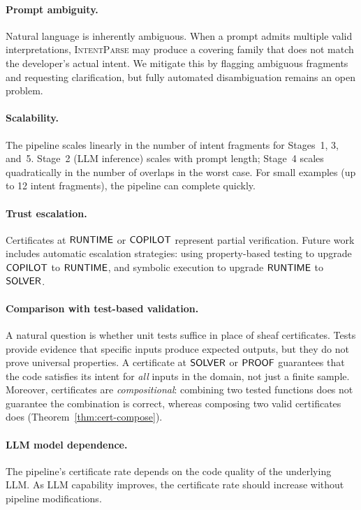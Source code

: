 \documentclass[11pt]{article}
\newcommand{\IntentParse}{\textsc{IntentParse}}
\begin{document}
\paragraph{Prompt ambiguity.}
Natural language is inherently ambiguous.  When a prompt admits
multiple valid interpretations, \IntentParse{} may produce a covering
family that does not match the developer's actual intent.  We mitigate
this by flagging ambiguous fragments and requesting clarification, but
fully automated disambiguation remains an open problem.

\paragraph{Scalability.}
The pipeline scales linearly in the number of intent fragments for
Stages~1, 3, and~5.  Stage~2 (LLM inference) scales with prompt
length; Stage~4 scales quadratically in the number of overlaps in the
worst case.  For small examples (up to 12 intent fragments), the pipeline can complete quickly.

\paragraph{Trust escalation.}
Certificates at $\mathsf{RUNTIME}$ or $\mathsf{COPILOT}$ represent partial
verification.  Future work includes automatic escalation strategies:
using property-based testing to upgrade $\mathsf{COPILOT}$ to $\mathsf{RUNTIME}$,
and symbolic execution to upgrade $\mathsf{RUNTIME}$ to $\mathsf{SOLVER}$.

\paragraph{Comparison with test-based validation.}
A natural question is whether unit tests suffice in place of sheaf
certificates.  Tests provide evidence that specific inputs produce
expected outputs, but they do not prove universal properties.  A
certificate at $\mathsf{SOLVER}$ or $\mathsf{PROOF}$ guarantees that the code
satisfies its intent for \emph{all} inputs in the domain, not just
a finite sample.  Moreover, certificates are \emph{compositional}:
combining two tested functions does not guarantee the combination is
correct, whereas composing two valid certificates does (Theorem~\ref{thm:cert-compose}).

\paragraph{LLM model dependence.}
The pipeline's certificate rate depends on the code quality of the
underlying LLM.  As LLM capability improves, the certificate rate
should increase without pipeline modifications.
\end{document}
